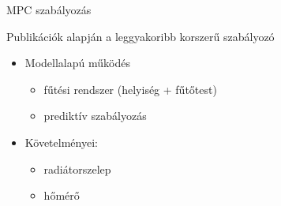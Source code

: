 \documentclass[14pt,handout]{beamer}
\begin{document}
%
%

%
%
%



\begin{frame}{MPC szabályozás}

Publikációk alapján a leggyakoribb korszerű szabályozó

\begin{itemize}
	\setlength{\itemsep}{12pt}
	\item Modellalapú működés
	\begin{itemize}
		\item fűtési rendszer (helyiség + fűtőtest)
		\item prediktív szabályozás
	\end{itemize}
	\item Követelményei:
	\begin{itemize}
		\item radiátorszelep
		\item hőmérő
	\end{itemize}
\end{itemize}
\end{frame}
\end{document}
